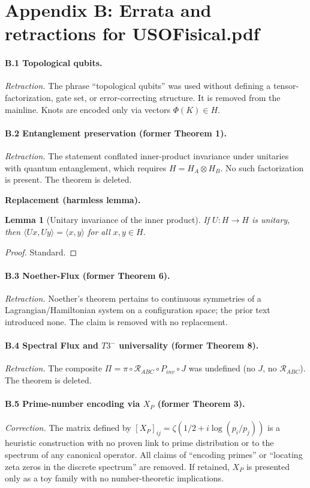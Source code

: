 \documentclass[11pt]{article}
\newtheorem{lemma}[theorem]{Lemma}
\theoremstyle{definition}
\theoremstyle{remark}
\newcommand{\1}{\mathbf{1}}
\begin{document}
\section*{Appendix B: Errata and retractions for \textnormal{USOFisical.pdf}}

\paragraph{B.1 Topological qubits.}
\emph{Retraction.} The phrase “topological qubits” was used without defining a tensor-factorization, gate set, or error-correcting structure. It is removed from the mainline. Knots are encoded only via vectors $\Phi(K)\in H$.

\paragraph{B.2 Entanglement preservation (former Theorem 1).}
\emph{Retraction.} The statement conflated inner-product invariance under unitaries with quantum entanglement, which requires $H=H_A\otimes H_B$. No such factorization is present. The theorem is deleted.
\medskip

\noindent\textbf{Replacement (harmless lemma).}
\begin{lemma}[Unitary invariance of the inner product]
If $U:H\to H$ is unitary, then $\langle Ux,Uy\rangle=\langle x,y\rangle$ for all $x,y\in H$.
\end{lemma}
\begin{proof}
Standard.
\end{proof}

\paragraph{B.3 Noether-Flux (former Theorem 6).}
\emph{Retraction.} Noether’s theorem pertains to continuous symmetries of a Lagrangian/Hamiltonian system on a configuration space; the prior text introduced none. The claim is removed with no replacement.

\paragraph{B.4 Spectral Flux and $T3^{-}$ universality (former Theorem 8).}
\emph{Retraction.} The composite $\Pi=\pi\circ\mathcal{R}_{ABC}\circ P_{inv}\circ J$ was undefined (no $J$, no $\mathcal{R}_{ABC}$). The theorem is deleted.

\paragraph{B.5 Prime-number encoding via $X_P$ (former Theorem 3).}
\emph{Correction.} The matrix defined by $[X_P]_{ij}=\zeta(1/2+i\log(p_i/p_j))$ is a heuristic construction with no proven link to prime distribution or to the spectrum of any canonical operator. All claims of “encoding primes” or “locating zeta zeros in the discrete spectrum” are removed. If retained, $X_P$ is presented only as a toy family with no number-theoretic implications.
\end{document}

